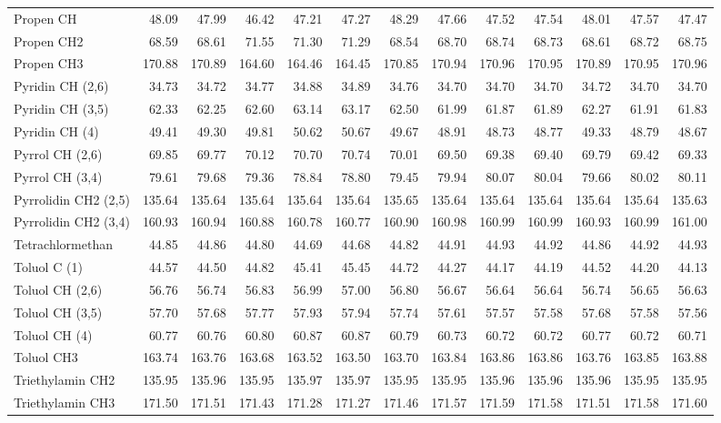 \begin{table}[ht!]
{\begin{tabular}{lrrrrrrrrrrrr}
    Propen CH & 48.09 & 47.99 & 46.42 & 47.21 & 47.27 & 48.29 & 47.66 & 47.52 & 47.54 & 48.01 & 47.57 & 47.47 \\
    Propen CH2 & 68.59 & 68.61 & 71.55 & 71.30 & 71.29 & 68.54 & 68.70 & 68.74 & 68.73 & 68.61 & 68.72 & 68.75 \\
    Propen CH3 & 170.88 & 170.89 & 164.60 & 164.46 & 164.45 & 170.85 & 170.94 & 170.96 & 170.95 & 170.89 & 170.95 & 170.96 \\
    Pyridin CH (2,6) & 34.73 & 34.72 & 34.77 & 34.88 & 34.89 & 34.76 & 34.70 & 34.70 & 34.70 & 34.72 & 34.70 & 34.70 \\
    Pyridin CH (3,5) & 62.33 & 62.25 & 62.60 & 63.14 & 63.17 & 62.50 & 61.99 & 61.87 & 61.89 & 62.27 & 61.91 & 61.83 \\
    Pyridin CH (4) & 49.41 & 49.30 & 49.81 & 50.62 & 50.67 & 49.67 & 48.91 & 48.73 & 48.77 & 49.33 & 48.79 & 48.67 \\
    Pyrrol CH (2,6) & 69.85 & 69.77 & 70.12 & 70.70 & 70.74 & 70.01 & 69.50 & 69.38 & 69.40 & 69.79 & 69.42 & 69.33 \\
    Pyrrol CH (3,4) & 79.61 & 79.68 & 79.36 & 78.84 & 78.80 & 79.45 & 79.94 & 80.07 & 80.04 & 79.66 & 80.02 & 80.11 \\
    Pyrrolidin CH2 (2,5) & 135.64 & 135.64 & 135.64 & 135.64 & 135.64 & 135.65 & 135.64 & 135.64 & 135.64 & 135.64 & 135.64 & 135.63 \\
    Pyrrolidin CH2 (3,4) & 160.93 & 160.94 & 160.88 & 160.78 & 160.77 & 160.90 & 160.98 & 160.99 & 160.99 & 160.93 & 160.99 & 161.00 \\
    Tetrachlormethan & 44.85 & 44.86 & 44.80 & 44.69 & 44.68 & 44.82 & 44.91 & 44.93 & 44.92 & 44.86 & 44.92 & 44.93 \\
    Toluol C (1) & 44.57 & 44.50 & 44.82 & 45.41 & 45.45 & 44.72 & 44.27 & 44.17 & 44.19 & 44.52 & 44.20 & 44.13 \\
    Toluol CH (2,6) & 56.76 & 56.74 & 56.83 & 56.99 & 57.00 & 56.80 & 56.67 & 56.64 & 56.64 & 56.74 & 56.65 & 56.63 \\
    Toluol CH (3,5) & 57.70 & 57.68 & 57.77 & 57.93 & 57.94 & 57.74 & 57.61 & 57.57 & 57.58 & 57.68 & 57.58 & 57.56 \\
    Toluol CH (4) & 60.77 & 60.76 & 60.80 & 60.87 & 60.87 & 60.79 & 60.73 & 60.72 & 60.72 & 60.77 & 60.72 & 60.71 \\
    Toluol CH3 & 163.74 & 163.76 & 163.68 & 163.52 & 163.50 & 163.70 & 163.84 & 163.86 & 163.86 & 163.76 & 163.85 & 163.88 \\
    Triethylamin CH2 & 135.95 & 135.96 & 135.95 & 135.97 & 135.97 & 135.95 & 135.95 & 135.96 & 135.96 & 135.96 & 135.95 & 135.95 \\
    Triethylamin CH3 & 171.50 & 171.51 & 171.43 & 171.28 & 171.27 & 171.46 & 171.57 & 171.59 & 171.58 & 171.51 & 171.58 & 171.60 \\
    \end{tabular}}%
  \label{tab:sigmacosmo}%
\end{table}%
